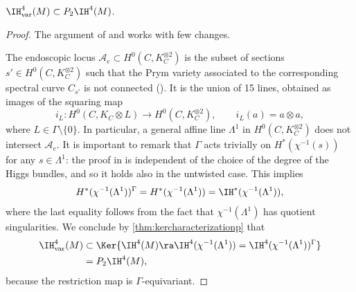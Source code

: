 \begin{prop}\label{prop:perv4var}
$\IH_{\mathrm{var}}^4(M) \subset P_2 \IH^4(M)$.
\end{prop}
\begin{proof}
The argument of \cite[\S 4.4]{deCataldoHauselMigliorini2012} and \cite[Prop.\,1.4]{deCataldoMaulikShen2020} works with few changes.

The endoscopic locus $\mathcal{A}_e \subset H^0(C, K_C^{\otimes 2})$ is the subset of sections $s' \in H^0(C, K_C^{\otimes 2})$ such that the Prym variety associated to the corresponding spectral curve $C_{s'}$ is not connected (\cf \cite[\S 4.4]{deCataldoHauselMigliorini2012}). It is the union of 15 lines, obtained as images of the squaring map\vspace*{-3pt}
\[
i_L\colon H^0(C, K_C \otimes L) \to H^0(C, K_C^{\otimes 2}), \qquad i_L(a)=a \otimes a,
\]
where $L \in \Gamma \setminus \{0\}$. In particular, a general affine line $\Lambda^1$ in $H^0(C, K_C^{\otimes 2})$ does not intersect $\mathcal{A}_e$. It is important to remark that $\Gamma$ acts trivially on $H^*(\chi^{-1}(s))$ for any $s \in \Lambda^1$: the proof in \cite[\S 4.4]{deCataldoHauselMigliorini2012} is independent of the choice of the degree of the Higgs bundles, and so it holds also in the untwisted case.
This implies\vspace*{-3pt}
\[
H^*(\chi^{-1}(\Lambda^1))^{\Gamma} = H^*(\chi^{-1}(\Lambda^1))= \IH^*(\chi^{-1}(\Lambda^1)),
\]
where the last equality follows from the fact that $\chi^{-1}(\Lambda^1)$ has quotient singularities.
We conclude by \cref{thm:kercharacterizationp} that\vspace*{-3pt}
\begin{align*}
\IH_{\mathrm{var}}^4(M) & \subset \Ker \{\IH^4(M) \ra \IH^4(\chi^{-1}(\Lambda^1))= \IH^4(\chi^{-1}(\Lambda^1))^{\Gamma}\}\\
& = P_2 \IH^4(M),
\end{align*}
because the restriction map is $\Gamma$-equivariant.
\end{proof}

